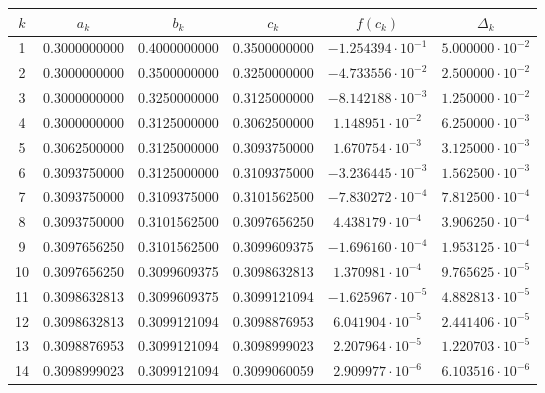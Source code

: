 \documentclass[12pt,a4paper]{article}
\begin{document}
    \begin{center}
        \scriptsize
        \begin{tabular}{|c|c|c|c|c|c|}
            \hline
            $k$ & $a_k$ & $b_k$ & $c_k$ & $f(c_k)$ & $\Delta_k$ \\
            \hline
            1 & 0.3000000000 & 0.4000000000 & 0.3500000000 & $-1.254394\cdot10^{-1}$ & $5.000000\cdot10^{-2}$ \\
            2 & 0.3000000000 & 0.3500000000 & 0.3250000000 & $-4.733556\cdot10^{-2}$ & $2.500000\cdot10^{-2}$ \\
            3 & 0.3000000000 & 0.3250000000 & 0.3125000000 & $-8.142188\cdot10^{-3}$ & $1.250000\cdot10^{-2}$ \\
            4 & 0.3000000000 & 0.3125000000 & 0.3062500000 & $1.148951\cdot10^{-2}$ & $6.250000\cdot10^{-3}$ \\
            5 & 0.3062500000 & 0.3125000000 & 0.3093750000 & $1.670754\cdot10^{-3}$ & $3.125000\cdot10^{-3}$ \\
            6 & 0.3093750000 & 0.3125000000 & 0.3109375000 & $-3.236445\cdot10^{-3}$ & $1.562500\cdot10^{-3}$ \\
            7 & 0.3093750000 & 0.3109375000 & 0.3101562500 & $-7.830272\cdot10^{-4}$ & $7.812500\cdot10^{-4}$ \\
            8 & 0.3093750000 & 0.3101562500 & 0.3097656250 & $4.438179\cdot10^{-4}$ & $3.906250\cdot10^{-4}$ \\
            9 & 0.3097656250 & 0.3101562500 & 0.3099609375 & $-1.696160\cdot10^{-4}$ & $1.953125\cdot10^{-4}$ \\
            10 & 0.3097656250 & 0.3099609375 & 0.3098632813 & $1.370981\cdot10^{-4}$ & $9.765625\cdot10^{-5}$ \\
            11 & 0.3098632813 & 0.3099609375 & 0.3099121094 & $-1.625967\cdot10^{-5}$ & $4.882813\cdot10^{-5}$ \\
            12 & 0.3098632813 & 0.3099121094 & 0.3098876953 & $6.041904\cdot10^{-5}$ & $2.441406\cdot10^{-5}$ \\
            13 & 0.3098876953 & 0.3099121094 & 0.3098999023 & $2.207964\cdot10^{-5}$ & $1.220703\cdot10^{-5}$ \\
            14 & 0.3098999023 & 0.3099121094 & 0.3099060059 & $2.909977\cdot10^{-6}$ & $6.103516\cdot10^{-6}$ \\
            \hline
        \end{tabular}
    \end{center}
\end{document}
